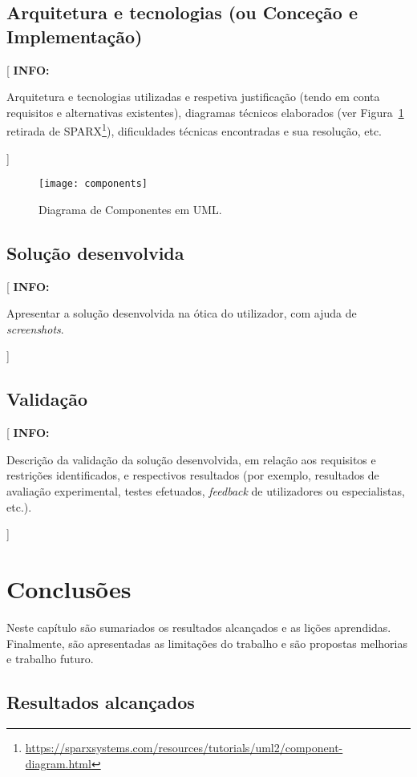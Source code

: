 \documentclass[11pt,a4paper]{report}
\newenvironment{info}[1]{\vspace*{6mm}\color{blue}[ \textbf{INFO:} \begin{em} #1}
                        {\vspace*{3mm}\end{em} ]}
\begin{document}
\section{Arquitetura e tecnologias (ou Conceção e Implementação)}

\begin{info}
Arquitetura e tecnologias utilizadas e respetiva justificação (tendo em conta requisitos e alternativas existentes), diagramas técnicos elaborados (ver Figura~\ref{fig:componentes} retirada de SPARX\footnote{\url{https://sparxsystems.com/resources/tutorials/uml2/component-diagram.html}}), dificuldades técnicas encontradas e sua resolução, etc.
\end{info}

\begin{figure}
\centering
\texttt{[image: components]}
\caption{Diagrama de Componentes em UML.} \label{fig:componentes}
\end{figure}

\section{Solução desenvolvida}

\begin{info}
Apresentar a solução desenvolvida na ótica do utilizador, com ajuda de \emph{screenshots}.
\end{info}

\section{Validação}

\begin{info}
Descrição da validação da solução desenvolvida, em relação aos requisitos e restrições identificados, e respectivos resultados (por exemplo, resultados de avaliação experimental, testes efetuados, \emph{feedback} de utilizadores ou especialistas, etc.).
\end{info}

\chapter{Conclusões}

Neste capítulo são sumariados os resultados alcançados e as lições
aprendidas.
Finalmente, são apresentadas as limitações do trabalho e são propostas
melhorias e trabalho futuro.

\section{Resultados alcançados}
\end{document}
